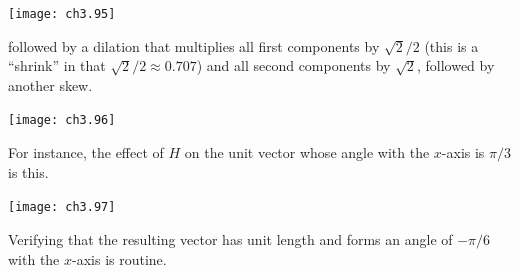 \begin{ans}{1}
\begin{exparts}
\begin{center}
            \texttt{[image: ch3.95]}
         \end{center}
         followed by a dilation that multiplies all first components by
         $\sqrt{2}/2$ (this is a ``shrink'' in that $\sqrt{2}/2\approx0.707$)
         and all second components by $\sqrt{2}$,
         followed by another skew.
          \begin{center}
            \texttt{[image: ch3.96]}
         \end{center}
         For instance, the effect of $H$ on the unit vector whose angle with
         the $x$-axis is $\pi/3$ is this.
          \begin{center}
            \texttt{[image: ch3.97]}
         \end{center}
         Verifying that the resulting vector has unit length and forms an
         angle of $-\pi/6$ with the $x$-axis is routine.
      \end{exparts}
    
\end{ans}
